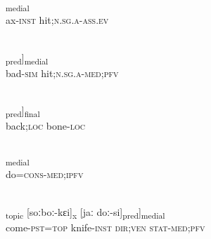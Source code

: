 \documentclass[output=paper]{LSP/langsci}
\begin{document}
\begin{appendixexe}
 \ex \label{Aiex:App38}
\textsubscript{medial}\\
ax-\textsc{inst}	hit;\textsc{n.sg.a}-\textsc{ass.ev}\\
\glt {}\\
\end{appendixexe}

\begin{appendixexe}
 \ex \label{Aiex:App39}
\gll \underline{\smash{[[moɡaːɡɛ-li}}	\underline{\smash{sɛdɛ-si]}}\textsubscript{pred}]\textsubscript{medial}\\
bad-\textsc{sim}	hit;\textsc{n.sg.a}-\textsc{med};\textsc{pfv}\\
\glt {}\\
\end{appendixexe}

\begin{appendixexe}
 \ex \label{Aiex:App40}
\gll [[ɸoːsɛː	kiː-jɛː]\textsubscript{pred}]\textsubscript{final}\\
back;\textsc{loc}	bone-\textsc{loc}\\
\glt {}\\
\end{appendixexe}

\begin{appendixexe}
 \ex \label{Aiex:App41}
\textsubscript{medial}\\
do=\textsc{cons}-\textsc{med};\textsc{ipfv}\\
\glt {}\\
\end{appendixexe}

\begin{appendixexe}
 \ex \label{Aiex:App42}
\gll [[mi-jɛː=jaː]\textsubscript{topic}	[soːboː-kɛi]\textsubscript{x}	[jaː	doː-si]\textsubscript{pred}]\textsubscript{medial}\\
come-\textsc{pst}=\textsc{top}	knife-\textsc{inst}	\textsc{dir;ven}	\textsc{stat}-\textsc{med};\textsc{pfv}\\
\glt {}\\
\end{appendixexe}
\end{document}
